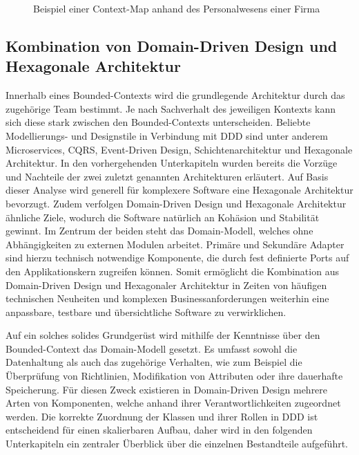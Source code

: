 \begin{figure}
	\centering
	\footnotesize
	
	\caption{Beispiel einer Context-Map anhand des Personalwesens einer Firma}
	\label{fig:Context-Map-Example}
\end{figure}

\subsection{Kombination von Domain-Driven Design und Hexagonale Architektur}

Innerhalb eines Bounded-Contexts wird die grundlegende Architektur durch das zugehörige Team bestimmt. Je nach Sachverhalt des jeweiligen Kontexts kann sich diese stark zwischen den Bounded-Contexts unterscheiden. Beliebte Modellierungs- und Designstile in Verbindung mit DDD sind unter anderem Microservices, \acrshort{CQRS}, Event-Driven Design, Schichtenarchitektur und Hexagonale Architektur. In den vorhergehenden Unterkapiteln wurden bereits die Vorzüge und Nachteile der zwei zuletzt genannten Architekturen erläutert. Auf Basis dieser Analyse wird generell für komplexere Software eine Hexagonale Architektur bevorzugt. Zudem verfolgen Domain-Driven Design und Hexagonale Architektur ähnliche Ziele, wodurch die Software natürlich an Kohäsion und Stabilität gewinnt. Im Zentrum der beiden steht das Domain-Modell, welches ohne Abhängigkeiten zu externen Modulen arbeitet. Primäre und Sekundäre Adapter sind hierzu technisch notwendige Komponente, die durch fest definierte Ports auf den Applikationskern zugreifen können. Somit ermöglicht die Kombination aus Domain-Driven Design und Hexagonaler Architektur in Zeiten von häufigen technischen Neuheiten und komplexen Businessanforderungen weiterhin eine anpassbare, testbare und übersichtliche Software zu verwirklichen.

Auf ein solches solides Grundgerüst wird mithilfe der Kenntnisse über den Bounded-Context das Domain-Modell gesetzt. Es umfasst sowohl die Datenhaltung als auch das zugehörige Verhalten, wie zum Beispiel die Überprüfung von Richtlinien, Modifikation von Attributen oder ihre dauerhafte Speicherung. Für diesen Zweck existieren in Domain-Driven Design mehrere Arten von Komponenten, welche anhand ihrer Verantwortlichkeiten zugeordnet werden. Die korrekte Zuordnung der Klassen und ihrer Rollen in DDD ist entscheidend für einen skalierbaren Aufbau, daher wird in den folgenden Unterkapiteln ein zentraler Überblick über die einzelnen Bestandteile aufgeführt.

